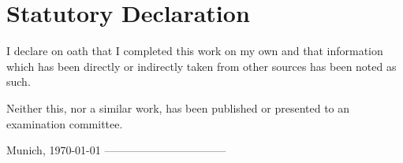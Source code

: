 \documentclass[document.tex]{subfiles}
\begin{document}
\renewcommand{\thesection}{}
\section*{Statutory Declaration}
I declare on oath that I completed this work on my own and that information which has been directly or indirectly taken from other sources has been noted as such.
 
Neither this, nor a similar work, has been published or presented to an examination committee. 
 
Munich, \today
\newline
\newline
\newline
\newline
\newline
---------------------------------\newline
\makeatletter \@author
\end{document}
